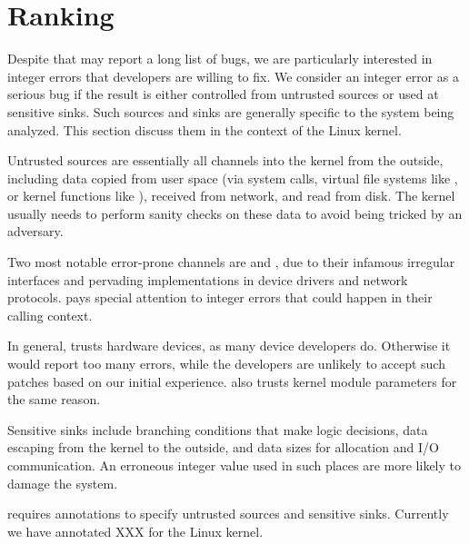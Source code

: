 \section{Ranking}

Despite that \sys may report a long list of bugs, we are particularly
interested in integer errors that developers are willing to fix.
We consider an integer error as a serious bug if the result is
either controlled from untrusted sources or used at sensitive sinks.
Such sources and sinks are generally specific to the system being
analyzed.  This section discuss them in the context of the Linux
kernel.

Untrusted sources are essentially all channels into the kernel from
the outside, including data copied from user space (via system
calls, virtual file systems like , or kernel functions
like ), received from network, and read from
disk.
The kernel usually needs to perform sanity checks on these data to
avoid being tricked by an adversary.

Two most notable error-prone channels are  and ,
due to their infamous irregular interfaces and pervading implementations
in device drivers and network protocols.  \sys pays special attention
to integer errors that could happen in their calling context.

In general, \sys trusts hardware devices, as many device developers
do.  Otherwise it would report too many errors, while the
developers are unlikely to accept such patches based on our initial
experience.  \sys also trusts kernel module parameters for the same
reason.

Sensitive sinks include branching conditions that make logic
decisions, data escaping from the kernel to the outside, and data
sizes for allocation and I/O communication.  An erroneous integer
value used in such places are more likely to damage the system.

\sys requires annotations to specify untrusted sources and sensitive
sinks.  Currently we have annotated XXX for the Linux kernel.
